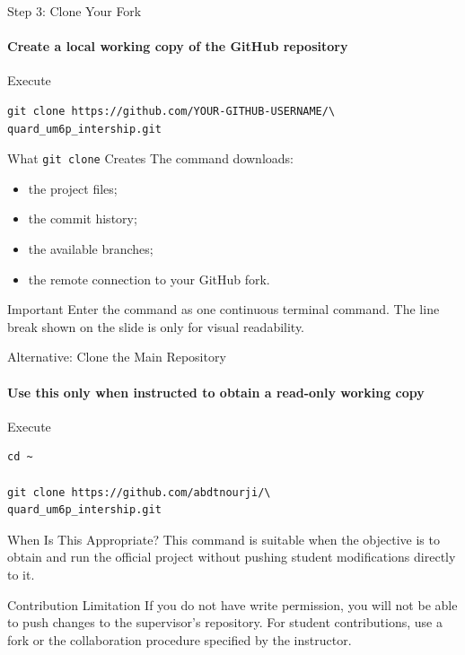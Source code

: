 \begin{frame}[fragile]{Step 3: Clone Your Fork}
\framesubtitle{Create a local working copy of the GitHub repository}

\footnotesize

\begin{block}{Execute}
\begin{verbatim}
git clone https://github.com/YOUR-GITHUB-USERNAME/\
quard_um6p_intership.git
\end{verbatim}
\end{block}

\begin{exampleblock}{What \texttt{git clone} Creates}
The command downloads:

\begin{itemize}
    \setlength{\itemsep}{0.18em}
    \item the project files;
    \item the commit history;
    \item the available branches;
    \item the remote connection to your GitHub fork.
\end{itemize}
\end{exampleblock}

\begin{alertblock}{Important}
Enter the command as one continuous terminal command. The line break
shown on the slide is only for visual readability.
\end{alertblock}

\end{frame}

\begin{frame}[fragile]{Alternative: Clone the Main Repository}
\framesubtitle{Use this only when instructed to obtain a read-only working copy}

\footnotesize

\begin{block}{Execute}
\begin{verbatim}
cd ~

git clone https://github.com/abdtnourji/\
quard_um6p_intership.git
\end{verbatim}
\end{block}

\begin{exampleblock}{When Is This Appropriate?}
This command is suitable when the objective is to obtain and run the
official project without pushing student modifications directly to it.
\end{exampleblock}

\begin{alertblock}{Contribution Limitation}
If you do not have write permission, you will not be able to push changes
to the supervisor's repository. For student contributions, use a fork or
the collaboration procedure specified by the instructor.
\end{alertblock}

\end{frame}

